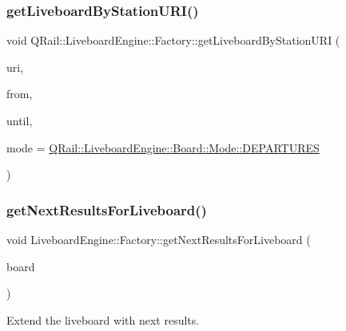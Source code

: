\subsubsection{\texorpdfstring{getLiveboardByStationURI()}{getLiveboardByStationURI()}\hspace{0.1cm}{\footnotesize\ttfamily [2/2]}}
{\footnotesize\ttfamily void Q\+Rail\+::\+Liveboard\+Engine\+::\+Factory\+::get\+Liveboard\+By\+Station\+U\+RI (\begin{DoxyParamCaption}\item[{const Q\+Url \&}]{uri,  }\item[{const Q\+Date\+Time \&}]{from,  }\item[{const Q\+Date\+Time \&}]{until,  }\item[{const \mbox{\hyperlink{classQRail_1_1LiveboardEngine_1_1Board_a0ab6d318f405895f62c6e98cb2d86c6e}{Q\+Rail\+::\+Liveboard\+Engine\+::\+Board\+::\+Mode}} \&}]{mode = {\ttfamily \mbox{\hyperlink{classQRail_1_1LiveboardEngine_1_1Board_a0ab6d318f405895f62c6e98cb2d86c6ea560e6dfa758a32c703224545b841a386}{Q\+Rail\+::\+Liveboard\+Engine\+::\+Board\+::\+Mode\+::\+D\+E\+P\+A\+R\+T\+U\+R\+ES}}} }\end{DoxyParamCaption})}

\mbox{\label{classQRail_1_1LiveboardEngine_1_1Factory_ad769a2f6bcfe1b411d83bd59bc4bc83b}} 
\subsubsection{\texorpdfstring{getNextResultsForLiveboard()}{getNextResultsForLiveboard()}}
{\footnotesize\ttfamily void Liveboard\+Engine\+::\+Factory\+::get\+Next\+Results\+For\+Liveboard (\begin{DoxyParamCaption}\item[{\mbox{\hyperlink{classQRail_1_1LiveboardEngine_1_1Board}{Q\+Rail\+::\+Liveboard\+Engine\+::\+Board}} $\ast$}]{board }\end{DoxyParamCaption})}



Extend the liveboard with next results. 



